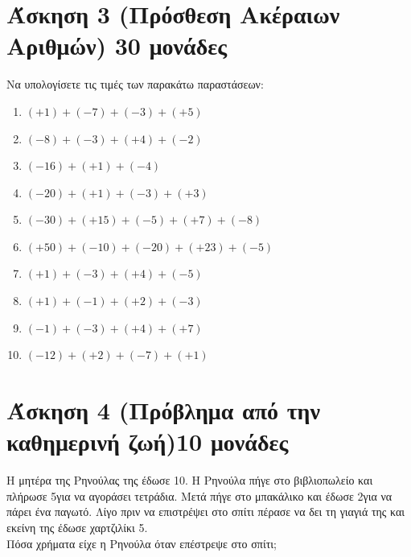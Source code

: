 \documentclass[a4paper,10pt]{report}
\begin{document}
\section*{Άσκηση 3 (Πρόσθεση Ακέραιων Αριθμών) \hfill \small{30 μονάδες}}
Να υπολογίσετε τις τιμές των παρακάτω παραστάσεων:
\begin{enumerate}[1)]
 \item $(+1)+(-7)+(-3)+(+5)$
 \item $(-8)+(-3)+(+4)+(-2)$
 \item $(-16)+(+1)+(-4)$
 \item $(-20)+(+1)+(-3)+(+3)$
 \item $(-30)+(+15)+(-5)+(+7)+(-8)$
 \item $(+50)+(-10)+(-20)+(+23)+(-5)$
 \item $(+1)+(-3)+(+4)+(-5)$
 \item $(+1)+(-1)+(+2)+(-3)$
 \item $(-1)+(-3)+(+4)+(+7)$
 \item $(-12)+(+2)+(-7)+(+1)$
\end{enumerate}



\section*{Άσκηση 4 (Πρόβλημα από την καθημερινή ζωή)\hfill \small{10 μονάδες}}
Η μητέρα της Ρηνούλας της έδωσε 10\texteuro. Η Ρηνούλα πήγε στο βιβλιοπωλείο και πλήρωσε 5\texteuro \quad για να αγοράσει 
τετράδια. Μετά πήγε στο μπακάλικο και έδωσε 2\texteuro \quad για να πάρει ένα παγωτό. 
Λίγο πριν να επιστρέψει στο σπίτι πέρασε να δει τη γιαγιά της και εκείνη της έδωσε χαρτζιλίκι 5\texteuro.\\
 Πόσα χρήματα είχε η Ρηνούλα όταν επέστρεψε στο σπίτι;
\end{document}
